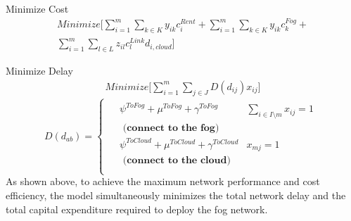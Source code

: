\documentclass[10pt,journal,compsoc]{IEEEtran}
\begin{document}
Minimize Cost
\begin{align}\label{obj1}
\textit{Minimize}\bigg[\sum_{i=1}^{m}\sum_{k\in K} y_{ik}c^{Rent}_i +\sum_{i=1}^{m}\sum_{k\in K}  y_{ik} c^{Fog}_k +\\
\sum_{i=1}^m \sum_{l\in L} z_{il} c^{Link}_l d_{i,cloud}\bigg]
\end{align}

Minimize Delay 
\begin{align}\label{obj2}
\textit{Minimize} \bigg[\sum_{i=1}^m\sum_{j\in J} D(d_{ij}) x_{ij}\bigg]
\end{align}
$$
D(d_{ab})  = 
	\begin{cases}
	\begin{aligned}
	&\psi^{ToFog} + \mu^{ToFog} + \gamma^{ToFog}&\sum_{i \in I  \setminus m}x_{ij} =1\\
	 &\textbf{ (connect to the fog)}\\
	&\psi^{ToCloud} + \mu^{ToCloud} + \gamma^{ToCloud}&x_{mj} = 1\\
	& \textbf{ (connect to the cloud)}\\
	\end{aligned}
	\end{cases}
$$
As shown above, to achieve the maximum network performance and cost efficiency, the model simultaneously minimizes the total network delay and the total capital expenditure required to deploy the fog network.  %
\end{document}
